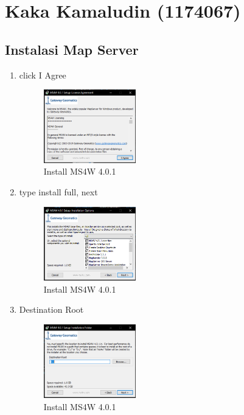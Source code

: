 \section{Kaka Kamaludin (1174067)}
\subsection{Instalasi Map Server}
\begin{enumerate}

    \item click I Agree
    \hfill\break
    \begin{figure}[H]
		\includegraphics[width=4cm]{figures/tugas4/1174067/1.png}
		\centering
		\caption{Install MS4W 4.0.1}
    \end{figure}
    \hfill\break

    \item type install full, next
    \hfill\break
    \begin{figure}[H]
		\includegraphics[width=4cm]{figures/tugas4/1174067/2.png}
		\centering
		\caption{Install MS4W 4.0.1}
    \end{figure}
    \hfill\break

    \item Destination Root
    \hfill\break
    \begin{figure}[H]
		\includegraphics[width=4cm]{figures/tugas4/1174067/3.png}
		\centering
		\caption{Install MS4W 4.0.1}
    \end{figure}
    \hfill\break


\end{enumerate}
